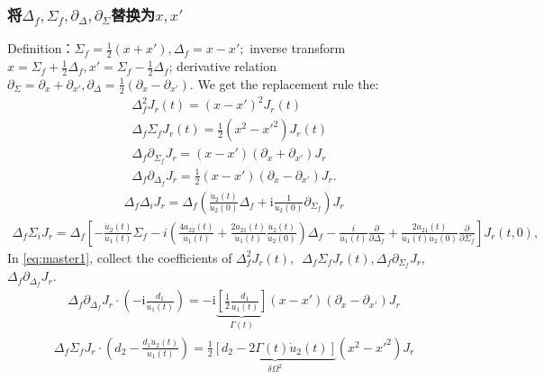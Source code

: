 \documentclass{article}
\begin{document}
\subsubsection{将$\Delta_f,\Sigma_f,\partial_{\Delta},\partial_{\Sigma}$替换为$x,x'$}
Definition：$\Sigma_{f}=\frac{1}{2}(x+x'),\Delta_f=x-x';$ inverse transform $x=\Sigma_f+\frac{1}{2}\Delta_f,x'=\Sigma_f-\frac{1}{2}\Delta_f$; derivative relation $\partial_{\Sigma}=\partial_x+\partial_{x'},\partial_\Delta=\frac{1}{2}(\partial_x-\partial_{x'})$.   We get the replacement rule the:
\begin{align*}
    \Delta_f^2J_r(t)=(x-x')^2J_r(t)\\
    \Delta_f\Sigma_fJ_r(t)=\frac{1}{2}({x^2-x'^2})J_r(t)\\
    \Delta_f\partial_{\Sigma_f}J_r=(x-x')(\partial_x+\partial_{x'})J_r\\
    \Delta_f\partial_{\Delta_f}J_r=\frac{1}{2}(x-x')(\partial_x-\partial_{x'})J_r.
\end{align*}
    \begin{align*}
        \Delta_f\Delta_iJ_r=\Delta_f(\frac{\dot{u}_2(t)}{\dot{u}_2(0)}\Delta_f+\mathrm{i}\frac{1}{\dot{u}_2(0)}\partial_{\Sigma_f})J_r
    \end{align*}
    \begin{align*}
        \Delta_f\Sigma_iJ_r=\Delta_f\left[ -\frac{\dot{u}_2(t)}{\dot{u}_1(t)} \Sigma_f - i \left( \frac{4a_{22}(t)}{\dot{u}_1(t)} + \frac{2a_{21}(t)}{\dot{u}_1(t)} \frac{\dot{u}_2(t)}{\dot{u}_2(0)} \right) \Delta_f - \frac{i}{\dot{u}_1(t)} \frac{\partial}{\partial \Delta_f} + \frac{2a_{21}(t)}{\dot{u}_1(t) \dot{u}_2(0)} \frac{\partial}{\partial \Sigma_f} \right] J_r(t, 0),
    \end{align*}
In \eqref{eq:master1}, collect the coefficients of $\Delta_f^2J_r(t),$\ $\Delta_f\Sigma_fJ_r(t),$$\Delta_f\partial_{\Sigma_f}J_r,$$\Delta_f\partial_{\Delta_f}J_r.$
    \begin{align*}
    \Delta_f\partial_{\Delta_f}J_r\cdot\left(-\mathrm{i}\frac{d_1}{\dot{u}_1(t)}\right)=-\mathrm{i}\underbrace{[\frac{1}{2}\frac{d_1}{\dot{u}_1(t)}]}_{\Gamma(t)}(x-x')(\partial_x-\partial_{x'})J_r
    \end{align*}
    \begin{align*}
        \Delta_f\Sigma_f J_r\cdot\left(d_2-\frac{d_1\dot{u}_2(t)}{\dot{u}_1(t)}\right)=\frac{1}{2}\underbrace{[d_2-2\Gamma(t)\dot{u}_2(t)]}_{\delta\Omega^2}(x^2-x'^2)J_r
    \end{align*}
\end{document}
